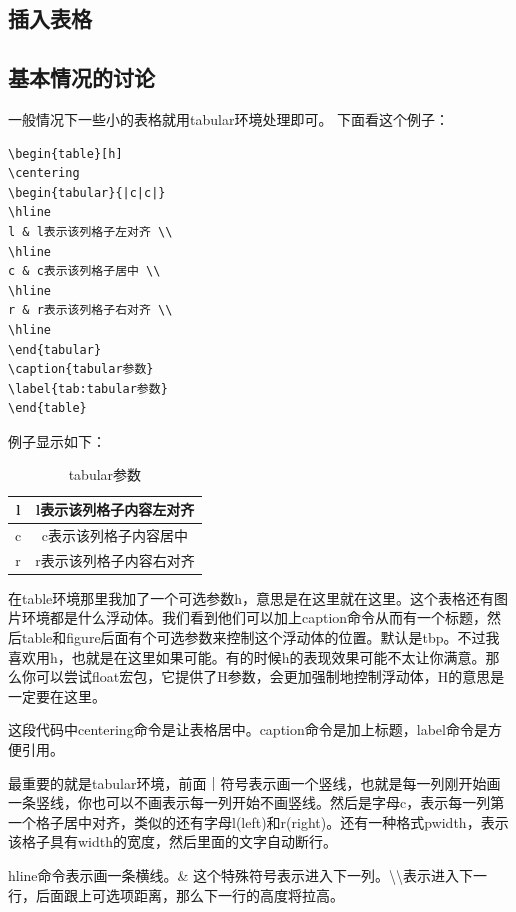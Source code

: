\documentclass[12pt,oneside]{book}
\begin{document}
\begin{common-format}
\section{插入表格}
\subsection{基本情况的讨论}
一般情况下一些小的表格就用tabular环境处理即可。
下面看这个例子：
\begin{Verbatim}
\begin{table}[h]
\centering
\begin{tabular}{|c|c|}
\hline
l & l表示该列格子左对齐 \\
\hline
c & c表示该列格子居中 \\
\hline
r & r表示该列格子右对齐 \\
\hline
\end{tabular}
\caption{tabular参数}
\label{tab:tabular参数}
\end{table}
\end{Verbatim}

例子显示如下：
\begin{table}[H]
\centering
\begin{tabular}{|c|c|}
\hline 
l & l表示该列格子内容左对齐 \\
\hline
c & c表示该列格子内容居中 \\  
\hline
r & r表示该列格子内容右对齐 \\ 
\hline
\end{tabular}
\caption{tabular参数}
\label{tab:tabular参数}
\end{table}
在table环境那里我加了一个可选参数h，意思是在这里就在这里。这个表格还有图片环境都是什么浮动体。我们看到他们可以加上caption命令从而有一个标题，然后table和figure后面有个可选参数来控制这个浮动体的位置。默认是tbp。不过我喜欢用h，也就是在这里如果可能。有的时候h的表现效果可能不太让你满意。那么你可以尝试float宏包，它提供了H参数，会更加强制地控制浮动体，H的意思是一定要在这里。

这段代码中centering命令是让表格居中。caption命令是加上标题，label命令是方便引用。

最重要的就是tabular环境，前面｜符号表示画一个竖线，也就是每一列刚开始画一条竖线，你也可以不画表示每一列开始不画竖线。然后是字母c，表示每一列第一个格子居中对齐，类似的还有字母l(left)和r(right)。还有一种格式p{width}，表示该格子具有width的宽度，然后里面的文字自动断行。

hline命令表示画一条横线。\& 这个特殊符号表示进入下一列。\textbackslash \textbackslash 表示进入下一行，后面跟上可选项距离，那么下一行的高度将拉高。



\end{common-format}
\end{document}
